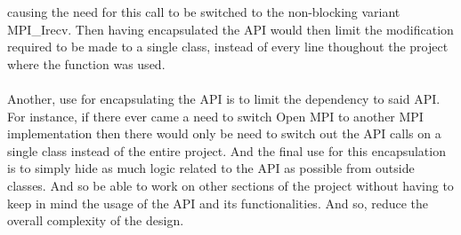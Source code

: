 \documentclass[11pt]{article}
\begin{document}
causing the need for this call to be switched to the non-blocking variant
MPI\_Irecv. Then having encapsulated the API would then limit the modification
required to be made to a single class, instead of every line thoughout the
project where the function was used.\paragraph{} Another, use for encapsulating
the API is to limit the dependency to said API. For instance, if there ever came
a need to switch Open MPI to another MPI implementation then there would only be
need to switch out the API calls on a single class instead of the entire
project. And the final use for this encapsulation is to simply hide as much
logic related to the API as possible from outside classes. And so be able to
work on other sections of the project without having to keep in mind the usage
of the API and its functionalities. And so, reduce the overall complexity of the
design.
\end{document}
